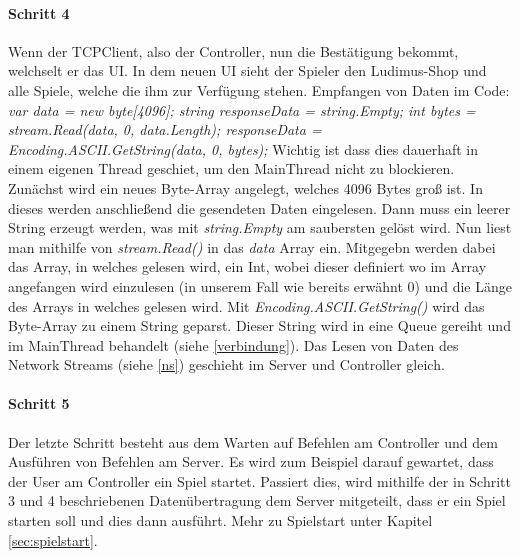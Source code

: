 \paragraph{Schritt 4}
Wenn der TCPClient, also der Controller, nun die Bestätigung bekommt, welchselt er das UI. In dem neuen UI sieht der Spieler den Ludimus-Shop und alle Spiele, welche die ihm zur Verfügung stehen.
Empfangen von Daten im Code: \newline
\textit{ 
var data = new byte[4096];\newline
string responseData = string.Empty;\newline
int bytes = stream.Read(data, 0, data.Length); \newline
responseData = Encoding.ASCII.GetString(data, 0, bytes); \newline}
Wichtig ist dass dies dauerhaft in einem eigenen Thread geschiet, um den MainThread nicht zu blockieren.
Zunächst wird ein neues Byte-Array angelegt, welches 4096 Bytes groß ist. In dieses werden anschließend die gesendeten Daten eingelesen.
Dann muss ein leerer String erzeugt werden, was mit \textit{string.Empty} am saubersten gelöst wird. 
Nun liest man mithilfe von \textit{stream.Read()} in das \textit{data} Array ein. 
Mitgegebn werden dabei das Array, in welches gelesen wird, ein Int, wobei dieser definiert wo im Array angefangen wird einzulesen (in unserem Fall wie bereits erwähnt 0) und die Länge des Arrays in welches gelesen wird.
Mit \textit{Encoding.ASCII.GetString()} wird das Byte-Array zu einem String geparst. 
Dieser String wird in eine Queue gereiht und im MainThread behandelt (siehe \ref{verbindung}). 
Das Lesen von Daten des Network Streams (siehe \ref{ns}) geschieht im Server und Controller gleich.
\paragraph{Schritt 5}
Der letzte Schritt besteht aus dem Warten auf Befehlen am Controller und dem Ausführen von Befehlen am Server.
Es wird zum Beispiel darauf gewartet, dass der User am Controller ein Spiel startet.
Passiert dies, wird mithilfe der in Schritt 3 und 4 beschriebenen Datenübertragung dem Server mitgeteilt, dass er ein Spiel starten soll und dies dann ausführt.
Mehr zu Spielstart unter Kapitel \ref{sec:spielstart}.